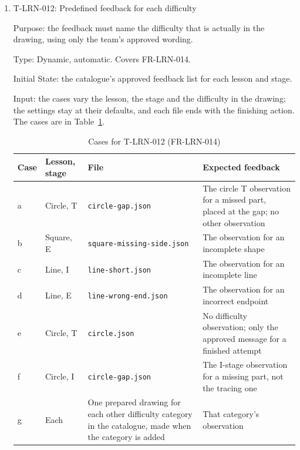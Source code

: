 \documentclass[12pt, titlepage]{article}
\newcommand{\testitem}[1]{\item #1\par\nopagebreak}
\begin{document}
\begin{enumerate}
Test Case Derivation: $\mathrm{Pass}(X, l, p)$ in SRS Section~9.2
requires $C = \mathrm{complete}$ and $v \ge \theta_p$, which gives (a) to
(c). These are the fit criterion's ``below, at and above the
adult-selected threshold'', at both ends of the range and at the default.
(d) and (e) follow invariant I3 and H-AHM-004. (f) follows FR-LRN-010. (g)
to (i) follow from the calibration bands: \texttt{CAL\_PASS\_MIN} is 90,
and \texttt{CAL\_NEAR\_MISS} is 70 to 79 with the near miss classified
complete. (h) and (i) show that the learner's own value is used. In (j),
the drawing scores at least \texttt{CAL\_INCOMPLETE\_MIN} (70), so only its
incomplete class can stop the pass.

How test will be performed: Vitest runs (a) to (f) against the lesson
rules. Playwright runs (g) to (j).

\testitem{T-LRN-012: Predefined feedback for each difficulty}

Purpose: the feedback must name the difficulty that is actually in the
drawing, using only the team's approved wording.

Type: Dynamic, automatic. Covers FR-LRN-014.

Initial State: the catalogue's approved feedback list for each lesson and
stage.

Input: the cases vary the lesson, the stage and the difficulty in the
drawing; the settings stay at their defaults, and each file ends with the
finishing action. The cases are in Table~\ref{tab:t-lrn-012}.

\begin{table}[htbp]
\centering\small
\caption{Cases for T-LRN-012 (FR-LRN-014)}
\label{tab:t-lrn-012}
\begin{tabularx}{\textwidth}{@{}l l >{\raggedright\arraybackslash}X
  >{\raggedright\arraybackslash}X@{}}
\toprule
\textbf{Case} & \textbf{Lesson, stage} & \textbf{File} &
\textbf{Expected feedback}\\
\midrule
a & Circle, T & \texttt{circle-\allowbreak{}gap.json} & The circle T
observation for a missed part, placed at the gap; no other observation\\
b & Square, E & \texttt{square-\allowbreak{}missing-\allowbreak{}side.json}
& The observation for an incomplete shape\\
c & Line, I & \texttt{line-\allowbreak{}short.json} & The observation for
an incomplete line\\
d & Line, E & \texttt{line-\allowbreak{}wrong-\allowbreak{}end.json} & The
observation for an incorrect endpoint\\
e & Circle, T & \texttt{circle.json} & No difficulty observation; only the
approved message for a finished attempt\\
f & Circle, I & \texttt{circle-\allowbreak{}gap.json} & The I-stage
observation for a missing part, not the tracing one\\
g & Each & One prepared drawing for each other difficulty category in the
catalogue, made when the category is added & That category's
observation\\
\bottomrule
\end{tabularx}
\end{table}


\end{enumerate}
\end{document}

